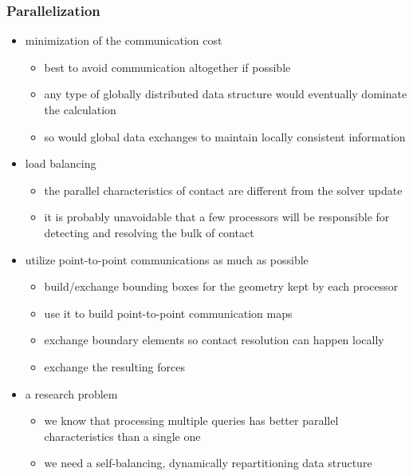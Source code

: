 \begin{frame}[fragile]
%
  \frametitle{Parallelization}
%
  \begin{itemize}
%
  \item minimization of the communication cost
    \begin{itemize}
    \item best to avoid communication altogether if possible
    \item any type of globally distributed data structure would eventually dominate the
      calculation
    \item so would global data exchanges to maintain locally consistent information
    \end{itemize}
  \item load balancing
    \begin{itemize}
    \item the parallel characteristics of contact are different from the solver update
    \item it is probably unavoidable that a few processors will be responsible for detecting and
      resolving the bulk of contact
    \end{itemize}
%
  \item utilize point-to-point communications as much as possible
    \begin{itemize}
    \item build/exchange bounding boxes for the geometry kept by each processor
    \item use it to build point-to-point communication maps
    \item exchange boundary elements so contact resolution can happen locally
    \item exchange the resulting forces
    \end{itemize}
%
  \item a research problem
    \begin{itemize}
    \item we know that processing multiple queries has better parallel characteristics than a
      single one
    \item we need a self-balancing, dynamically repartitioning data structure
    \end{itemize}
%
  \end{itemize}
%
\end{frame}


